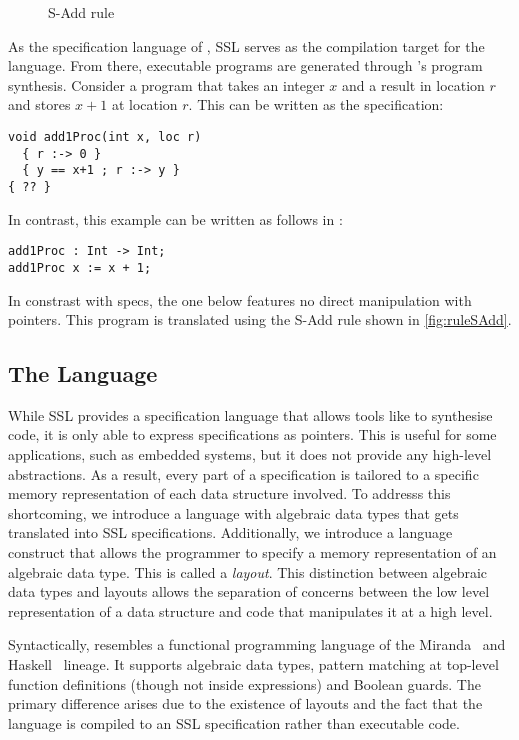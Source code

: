 \begin{figure}
  \caption{{\sc S-Add} rule}
  \label{fig:ruleSAdd}
\end{figure}

As the specification language of \SuSLik, SSL serves as the
compilation target for the \Pika{} language. From there, executable
programs are generated through \SuSLik's program synthesis. Consider a
program that takes an integer $x$ and a result in location $r$ and
stores $x+1$ at location $r$. This can be written as the \SuSLik{}
specification:

\begin{lstlisting}
void add1Proc(int x, loc r)
  { r :-> 0 }
  { y == x+1 ; r :-> y }
{ ?? }
\end{lstlisting}

\noindent
In contrast, this example can be written as follows in \Pika:

\begin{lstlisting}
add1Proc : Int -> Int;
add1Proc x := x + 1;
\end{lstlisting}

\noindent
In constrast with \SuSLik{} specs, the one below features no direct
manipulation with pointers.
%
This program is translated using the {\sc S-Add} rule shown in
\autoref{fig:ruleSAdd}. 

\subsection{The \Pika{} Language}
\label{sec:language}

While SSL provides a specification language that allows tools like
\SuSLik{} to synthesise code, it is only able to express specifications
as pointers. This is useful for some applications, such as embedded
systems, but it does not provide any high-level abstractions. As a
result, every part of a specification is tailored to a specific memory
representation of each data structure involved.
%
To addresss this shortcoming, we introduce a language with algebraic
data types that gets translated into SSL specifications. Additionally,
we introduce a language construct that allows the programmer to
specify a memory representation of an algebraic data type. This is
called a \textit{layout}. This distinction between algebraic data
types and layouts allows the separation of concerns between the low
level representation of a data structure and code that manipulates it
at a high level.

Syntactically, \Pika{} resembles a functional programming language
of the Miranda~\cite{turner:1986:miranda} and
Haskell~\cite{hudak:2007:haskell} lineage. It supports algebraic data
types, pattern matching at top-level function definitions (though not
inside expressions) and Boolean guards. The primary difference arises
due to the existence of layouts and the fact that the language is
compiled to an SSL specification rather than executable code.

